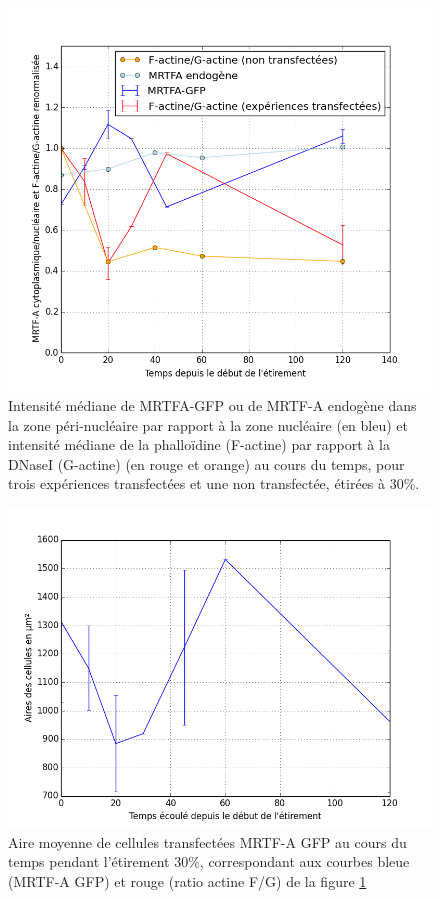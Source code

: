 \begin{figure}
\includegraphics[scale=0.5]{Figures/Et30_MRTFA_FG.png} 
\caption{\label{Et30_MRTFA_FG} Intensité médiane de MRTFA-GFP ou de MRTF-A endogène dans la zone péri-nucléaire par rapport à la zone nucléaire (en bleu) et intensité médiane de la phalloïdine (F-actine) par rapport à la DNaseI (G-actine) (en rouge et orange)  au cours du temps, pour trois expériences transfectées et une non transfectée, étirées à 30\%.  }
\end{figure}
\begin{figure}
\includegraphics[scale=0.5]{Figures/Et30_Aires.png} 
\caption{\label{Et30_Aires} Aire moyenne de cellules transfectées MRTF-A GFP au cours du temps pendant l'étirement 30\%, correspondant aux courbes bleue (MRTF-A GFP) et rouge (ratio actine F/G) de la figure \ref{Et30_MRTFA_FG} }
\end{figure}
